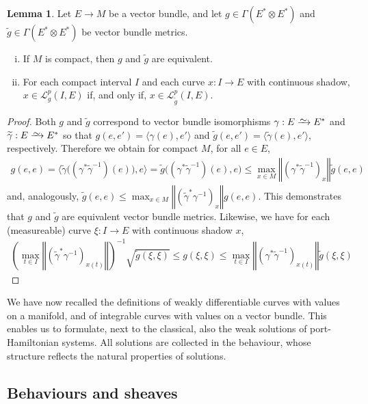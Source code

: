 \documentclass[preprint,12pt]{elsarticle}
\theoremstyle{definition}
\newtheorem{lemma}[theorem]{Lemma}
\newcommand{\norm}[1]{\left\Vert #1\right\Vert}
\newcommand{\simto}{\xrightarrow{\raisebox{-0.7ex}[0ex][0ex]{$\sim$}}} %
\begin{document}
\begin{lemma}\label{lem:independence_of_metric}
Let $E\to M$ be a vector bundle, and let $g\in\Gamma(E^*\otimes E^*)$ and $\widetilde{g}\in\Gamma(E^*\otimes E^*)$ be vector bundle metrics.
\begin{enumerate}[(i)]
\item If $M$ is compact, then $g$ and $\widetilde{g}$ are equivalent.
\item For each compact interval $I$ and each curve $x:I\to E$ with continuous shadow, $x\in \mathcal{L}^p_g(I,E)$ if, and only if, $x\in \mathcal{L}^p_{\widetilde{g}}(I,E)$.
\end{enumerate}
\end{lemma}
\begin{proof}
Both $g$ and $\widetilde{g}$ correspond to vector bundle isomorphisms $\gamma:E\simto E^*$ and $\widetilde{\gamma}:E\simto E^*$ so that $g(e,e') = \langle\gamma(e),e'\rangle$ and $\widetilde{g}(e,e') = \langle\widetilde{\gamma}(e),e'\rangle$, respectively. Therefore we obtain for compact $M$, for all $e\in E$,
\begin{align*}
g(e,e) = \langle\widetilde\gamma\big((\gamma^*\widetilde{\gamma}^{-1})(e)\big),e\rangle = \widetilde{g}\big((\gamma^*\widetilde{\gamma}^{-1})(e),e)\leq  \max_{x\in M}\norm{(\gamma^*\widetilde{\gamma}^{-1})_x}\widetilde{g}(e,e)
\end{align*}
and, analogously, $\widetilde g(e,e)\leq \max_{x\in M}\norm{(\widetilde\gamma^*{\gamma}^{-1})_x}g(e,e)$. This demonstrates that $g$ and $\widetilde{g}$ are equivalent vector bundle metrics. Likewise, we have for each (measureable) curve $\xi:I\to E$ with continuous shadow $x$,
\begin{align*}
\left({\max_{t\in I}\norm{(\widetilde\gamma^*{\gamma}^{-1})_{x(t)}}}\right)^{-1}\sqrt{\widetilde g(\xi,\xi)} \leq {g(\xi,\xi)}\leq {\max_{t\in I}\norm{(\gamma^*\widetilde{\gamma}^{-1})_{x(t)}}}{\widetilde g(\xi,\xi)}
\end{align*}
\end{proof}

We have now recalled the definitions of weakly differentiable curves with values on a manifold, and of integrable curves with values on a vector bundle. This enables us to formulate, next to the classical, also the weak solutions of port-Hamiltonian systems. All solutions are collected in the behaviour, whose structure reflects the natural properties of solutions.

\subsection{Behaviours and sheaves}\label{sec:behaviours}
\end{document}
